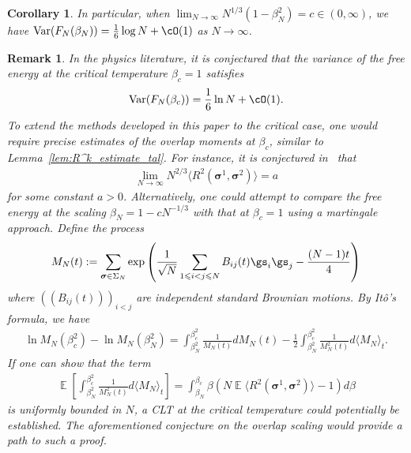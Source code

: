 \documentclass[letterpaper,11pt,reqno]{amsart}
\newtheorem{cor}[thm]{Corollary}
\newtheorem{remark}{Remark}
\renewcommand{\le}{\leqslant}
\newcommand{\ra}{\rangle}
\newcommand{\la}{\langle}
\newcommand{\mvgs}{\boldsymbol{\sigma}}\newcommand{\mvgS}{\boldsymbol{\Sigma}}\newcommand{\mvgt}{\boldsymbol{\tau}}
\DeclareMathOperator{\E}{\mathds{E}}
\DeclareMathOperator{\var}{Var}
\begin{document}
\begin{cor}
In particular, when $\lim_{N \to \infty} N^{1/3} (1 - \beta_N^2) = c \in (0,\infty)$, we have  $\var(F_N(\beta_N))  = \frac16\log N + \cO(1)$ as $N\to\infty$.
\end{cor}


\begin{remark}
    In the physics literature, it is conjectured that the variance of the free energy at the critical temperature $\beta_c = 1$ satisfies
    \begin{align*}
        \var ( F_N(\beta_c)) = \frac{1}{6} \ln N + \cO(1).
    \end{align*}
    To extend the methods developed in this paper to the critical case, one would require precise estimates of the overlap moments at $\beta_c$, similar to Lemma~\ref{lem:R^k_estimate_tal}. For instance, it is conjectured in~\cite[Conjecture 11.7.5]{Tal2}  that 
    \begin{align*}
        \lim_{N \to \infty} N^{2/3} \la R^2(\mvgs^1, \mvgs^2) \ra = a
    \end{align*}
    for some constant $a>0$. Alternatively, one could attempt to compare the free energy at the scaling $\beta_N = 1 - c N^{-1/3}$ with that at $\beta_c = 1$ using a martingale approach. Define the process
    \begin{align*}
        M_N(t) := \sum_{\mvgs \in \Sigma_N} \exp \left( \frac{1}{\sqrt{N}} \sum_{1 \le i<j \le N} B_{ij}(t) \gs_i \gs_j - \frac{(N-1)t}{4} \right)
    \end{align*}
    where $((B_{ij}(t)))_{i<j}$ are independent standard Brownian motions. By Itô's formula, we have
    \begin{align*}
        \ln M_N(\beta_c^2) - \ln M_N(\beta_N^2) = \int_{\beta_N^2}^{\beta_c^2} \frac{1}{M_N(t)} dM_N(t) - \frac{1}{2} \int_{\beta_N^2}^{\beta_c^2} \frac{1}{M_N^2(t)} d\la M_N \ra_t. 
    \end{align*}
    If one can show that the term
    \begin{align*}
         \E \left[ \int_{\beta_N^2}^{\beta_c^2} \frac{1}{M_N^2(t)} d\la M_N \ra_t \right]
         = \int_{\beta_N}^{\beta_c} \beta (N \E \la R^2(\mvgs^1, \mvgs^2) \ra -1 ) d\beta
    \end{align*}  
    is uniformly bounded in $N$, a CLT at the critical temperature could potentially be established. The aforementioned conjecture on the overlap scaling would provide a path to such a proof.
\end{remark}
\end{document}
